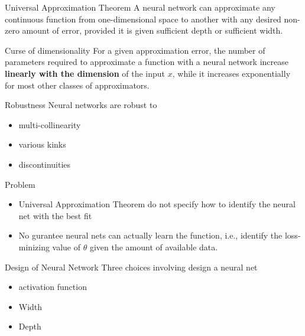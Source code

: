 \documentclass[aspectratio=169]{beamer} %
\begin{document}
\begin{frame}{Universal Approximation Theorem}
A neural network can approximate any continuous function from one-dimensional space to another with any desired non-zero amount of error, provided it is given sufficient depth or sufficient width.
    
\end{frame}

\begin{frame}{Curse of dimensionality}
For a given approximation error, the number of parameters required to approximate a function with a neural network increase \textbf{linearly with the dimension} of the input $x$, while it increases exponentially for most other classes of approximators.
    
\end{frame}
\begin{frame}{Robustness}
Neural networks are robust to
\begin{itemize}
    \item multi-collinearity
    \item various kinks
    \item discontinuities
\end{itemize}
    
\end{frame}

\begin{frame}{Problem}
\begin{itemize}
    \item Universal Approximation Theorem do not specify how to identify the neural net with the best fit
    \item No gurantee neural nets can actually learn the function, i.e., identify the loss-minizing value of $\theta$ given the amount of available data.
\end{itemize}
    
\end{frame}

\begin{frame}{Design of Neural Network}
Three choices involving design a neural net
\begin{itemize}
    \item activation function 
    \item Width
    \item Depth
\end{itemize}
    
\end{frame}
\end{document}

